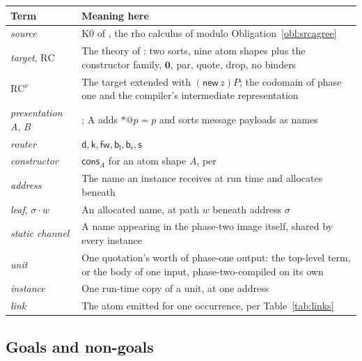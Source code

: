 \documentclass[11pt,a4paper]{article}
\makeatletter
\newcommand{\quo}[1]{@#1}
\newcommand{\drp}[1]{{*}#1}
\newcommand{\nil}{\mathbf{0}}
\newcommand{\dd}{\mathsf{d}}
\newcommand{\kk}{\mathsf{k}}
\newcommand{\fw}{\mathsf{fw}}
\newcommand{\bl}{\mathsf{b}_{\mathsf{l}}}
\newcommand{\br}{\mathsf{b}_{\mathsf{r}}}
\newcommand{\sy}{\mathsf{s}}
\newcommand{\cons}{\mathsf{cons}}
\theoremstyle{definition}
\theoremstyle{plain}
\makeatother
\begin{document}
\begin{center}
\begin{tabularx}{\linewidth}{@{}l>{\raggedright\arraybackslash}X@{}}
\toprule
Term & Meaning here\\
\midrule
\emph{source} & K0 of \cite{k1ndl1ng}, the rho calculus of
\cite[\S2]{draft3} modulo Obligation~\ref{obl:srcagree}\\
\emph{target}, $\mathrm{RC}$ & The theory of \cite[\S3]{draft3}: two sorts,
nine atom shapes plus the constructor family, $\nil$, par, quote, drop, no
binders\\
$\mathrm{RC}^{\nu}$ & The target extended with
$(\mathsf{new}\,z)P$; the codomain of phase one and the compiler's
intermediate representation\\
\emph{presentation A}, \emph{B} & \cite[\S3.3]{draft3}; A adds
$\drp{\quo{p}} = p$ and sorts message payloads as names\\
\emph{router} & $\dd,\kk,\fw,\bl,\br,\sy$\\
\emph{constructor} & $\cons_{A}$ for an atom shape $A$, per
\cite[Def.~3.8]{draft3}\\
\emph{address} & The name an instance receives at run time and allocates
beneath\\
\emph{leaf}, $\sigma\!\cdot\!w$ & An allocated name, at path $w$ beneath
address $\sigma$\\
\emph{static channel} & A name appearing in the phase-two image itself,
shared by every instance\\
\emph{unit} & One quotation's worth of phase-one output: the top-level term,
or the body of one input, phase-two-compiled on its own\\
\emph{instance} & One run-time copy of a unit, at one address\\
\emph{link} & The atom emitted for one occurrence, per Table~\ref{tab:links}\\
\bottomrule
\end{tabularx}
\end{center}

\subsection{Goals and non-goals}
\end{document}
